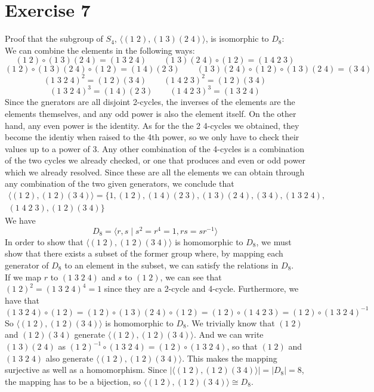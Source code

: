 \documentclass{article}
\begin{document}
    \section*{Exercise 7}
    Proof that the subgroup of $S_4$,
    $\langle (1\;2), (1\;3)(2\;4) \rangle$,
    is isomorphic to $D_8$: \\
    We can combine the elements in the following ways:
    \[ (1\;2) \circ (1\;3)(2\;4) = (1\;3\;2\;4) \qquad
    (1\;3)(2\;4) \circ (1\;2) = (1\;4\;2\;3) \]
    \[ (1\;2) \circ (1\;3)(2\;4) \circ (1\;2) = (1\;4)(2\;3) \qquad
    (1\;3)(2\;4) \circ (1\;2) \circ (1\;3)(2\;4) = (3\;4) \]
    \[ (1\;3\;2\;4)^2 = (1\;2)(3\;4) \qquad
    (1\;4\;2\;3)^2 = (1\;2)(3\;4) \]
    \[ (1\;3\;2\;4)^3 = (1\;4)(2\;3) \qquad
    (1\;4\;2\;3)^3 = (1\;3\;2\;4) \]
    Since the gnerators are all disjoint 2-cycles,
    the inverses of the elements are the elements themselves,
    and any odd power is also the element itself.
    On the other hand, any even power is the identity.
    As for the the 2 4-cycles we obtained,
    they become the identiy when raised to the 4th power,
    so we only have to check their values up to a power of 3.
    Any other combination of the 4-cycles
    is a combination of the two cycles we already checked,
    or one that produces and even or odd power
    which we already resolved.
    Since these are all the elements we can obtain
    through any combination of the two given generators,
    we conclude that 
    \begin{align*}
        \langle (1\;2), (1\;2)(3\;4) \rangle
        = \{1, (1\;2), (1\;4)(2\;3), (1\;3)(2\;4), (3\;4), (1\;3\;2\;4), \\
        (1\;4\;2\;3), (1\;2)(3\;4) \}
    \end{align*}
    We have 
    \[D_{8} = \langle r, s \mid s^2 = r^4 = 1, rs = sr^{-1} \rangle\]
    In order to show that $\langle (1\;2), (1\;2)(3\;4) \rangle$
    is homomorphic to $D_8$,
    we must show that there exists a subset of the former group
    where, by mapping each generator of $D_8$ to an element in the subset,
    we can satisfy the relations in $D_8$. \\
    If we map $r$ to $(1\;3\;2\;4)$
    and $s$ to $(1\;2)$,
    we can see that $(1\;2)^2 = (1\;3\;2\;4)^4 = 1$
    since they are a 2-cycle and 4-cycle.
    Furthermore, we have that
    \[ (1\;3\;2\;4) \circ (1\;2) = (1\;2) \circ (1\;3)(2\;4) \circ (1\;2)
    = (1\;2) \circ (1\;4\;2\;3)
    = (1\;2) \circ (1\;3\;2\;4)^{-1} \]
    So $\langle (1\;2), (1\;2)(3\;4) \rangle$ is homomorphic to $D_8$.
    We trivially know that $(1\;2)$ and $(1\;2)(3\;4)$
    generate $\langle (1\;2), (1\;2)(3\;4) \rangle$.
    And we can write $(1\;3)(2\;4)$
    as $(1\;2)^{-1} \circ (1\;3\;2\;4) = (1\;2) \circ (1\;3\;2\;4)$,
    so that $(1\;2)$ and $(1\;3\;2\;4)$
    also generate $\langle (1\;2), (1\;2)(3\;4) \rangle$.
    This makes the mapping surjective as well as a homomorphism.
    Since $|\langle (1\;2), (1\;2)(3\;4) \rangle| = |D_8| = 8$,
    the mapping has to be a bijection,
    so $\langle (1\;2), (1\;2)(3\;4) \rangle \cong D_8$.
\end{document}
